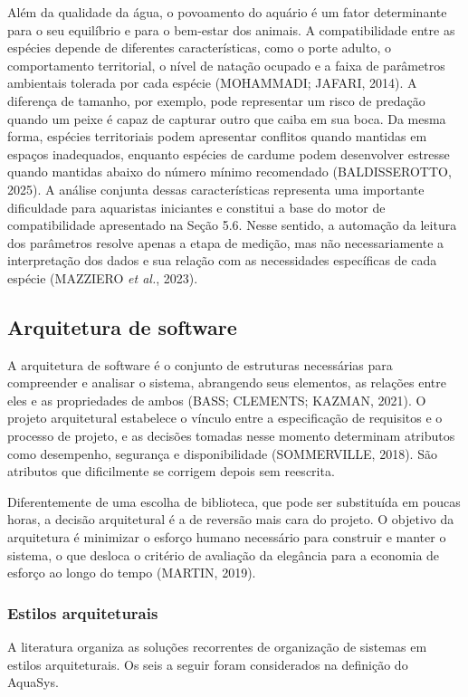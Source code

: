 \documentclass[12pt,oneside,a4paper,brazilian]{abntex2}
\begin{document}
Além da qualidade da água, o povoamento do aquário é um fator determinante para o seu equilíbrio e para o bem-estar dos animais. A compatibilidade entre as espécies depende de diferentes características, como o porte adulto, o comportamento territorial, o nível de natação ocupado e a faixa de parâmetros ambientais tolerada por cada espécie (MOHAMMADI; JAFARI, 2014). A diferença de tamanho, por exemplo, pode representar um risco de predação quando um peixe é capaz de capturar outro que caiba em sua boca. Da mesma forma, espécies territoriais podem apresentar conflitos quando mantidas em espaços inadequados, enquanto espécies de cardume podem desenvolver estresse quando mantidas abaixo do número mínimo recomendado (BALDISSEROTTO, 2025). A análise conjunta dessas características representa uma importante dificuldade para aquaristas iniciantes e constitui a base do motor de compatibilidade apresentado na Seção 5.6. Nesse sentido, a automação da leitura dos parâmetros resolve apenas a etapa de medição, mas não necessariamente a interpretação dos dados e sua relação com as necessidades específicas de cada espécie (MAZZIERO \textit{et al.}, 2023).


\subsection{Arquitetura de software}
A arquitetura de software é o conjunto de estruturas necessárias para compreender e analisar o sistema, abrangendo seus elementos, as relações entre eles e as propriedades de ambos (BASS; CLEMENTS; KAZMAN, 2021). O projeto arquitetural estabelece o vínculo entre a especificação de requisitos e o processo de projeto, e as decisões tomadas nesse momento determinam atributos como desempenho, segurança e disponibilidade (SOMMERVILLE, 2018). São atributos que dificilmente se corrigem depois sem reescrita.

Diferentemente de uma escolha de biblioteca, que pode ser substituída em poucas horas, a decisão arquitetural é a de reversão mais cara do projeto. O objetivo da arquitetura é minimizar o esforço humano necessário para construir e manter o sistema, o que desloca o critério de avaliação da elegância para a economia de esforço ao longo do tempo (MARTIN, 2019).


\subsubsection{Estilos arquiteturais}
A literatura organiza as soluções recorrentes de organização de sistemas em estilos arquiteturais. Os seis a seguir foram considerados na definição do AquaSys.
\end{document}
